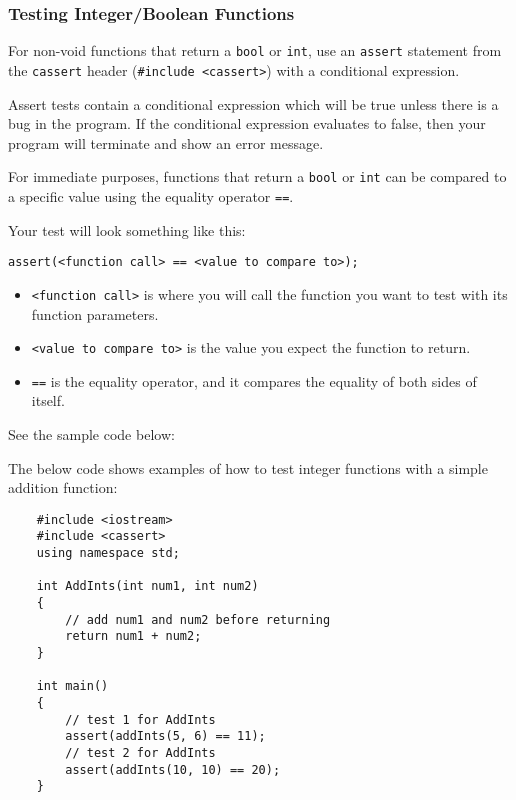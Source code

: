 \subsubsection{Testing Integer/Boolean Functions}

For non-void functions that return a \texttt{bool} or \texttt{int}, use an \texttt{assert} statement from the \texttt{cassert} header (\texttt{#include <cassert>}) with a conditional expression.

Assert tests contain a conditional expression which will be true unless there is a bug in the program. If the conditional expression evaluates to false, then your program will terminate and show an error message.

For immediate purposes, functions that return a \texttt{bool} or \texttt{int} can be compared to a specific value using the equality operator \texttt{==}.

Your test will look something like this:

\texttt{assert(<function call> == <value to compare to>);}

\begin{itemize}
    \item \texttt{<function call>} is where you will call the function you want to test with its function parameters.
    \item \texttt{<value to compare to>} is the value you expect the function to return.
    \item \texttt{==} is the equality operator, and it compares the equality of both sides of itself.
\end{itemize}

See the sample code below:

\begin{example}
    The below code shows examples of how to test integer functions with a simple addition function:
    \begin{verbatim}
    #include <iostream>
    #include <cassert>
    using namespace std;
    
    int AddInts(int num1, int num2)
    {
        // add num1 and num2 before returning
        return num1 + num2;
    }
    
    int main()
    {
        // test 1 for AddInts
        assert(addInts(5, 6) == 11);
        // test 2 for AddInts
        assert(addInts(10, 10) == 20);
    }
    \end{verbatim}
\end{example}

